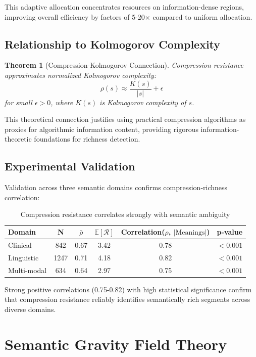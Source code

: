 \documentclass[12pt,a4paper]{article}
\newtheorem{theorem}{Theorem}
\begin{document}
This adaptive allocation concentrates resources on information-dense regions, improving overall efficiency by factors of 5-20× compared to uniform allocation.

\subsection{Relationship to Kolmogorov Complexity}

\begin{theorem}[Compression-Kolmogorov Connection]
Compression resistance approximates normalized Kolmogorov complexity:
\begin{equation}
\rho(s) \approx \frac{K(s)}{|s|} + \epsilon
\end{equation}
for small $\epsilon > 0$, where $K(s)$ is Kolmogorov complexity of $s$.
\end{theorem}

This theoretical connection justifies using practical compression algorithms as proxies for algorithmic information content, providing rigorous information-theoretic foundations for richness detection.

\subsection{Experimental Validation}

Validation across three semantic domains confirms compression-richness correlation:

\begin{table}[H]
\centering
\begin{tabular}{lccccc}
\toprule
Domain & N & $\bar{\rho}$ & $\mathbb{E}[\mathcal{R}]$ & Correlation($\rho$, $|\text{Meanings}|$) & p-value \\
\midrule
Clinical & 842 & 0.67 & 3.42 & 0.78 & $<0.001$ \\
Linguistic & 1247 & 0.71 & 4.18 & 0.82 & $<0.001$ \\
Multi-modal & 634 & 0.64 & 2.97 & 0.75 & $<0.001$ \\
\bottomrule
\end{tabular}
\caption{Compression resistance correlates strongly with semantic ambiguity}
\end{table}

Strong positive correlations (0.75-0.82) with high statistical significance confirm that compression resistance reliably identifies semantically rich segments across diverse domains.


\section{Semantic Gravity Field Theory}
\end{document}
